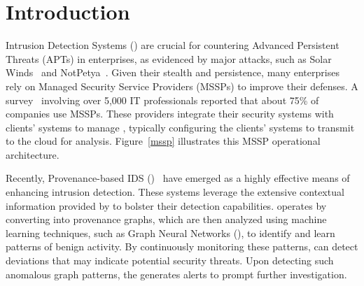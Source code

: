 \section{Introduction}
\label{s:intro}









Intrusion Detection Systems (\ids) are crucial for countering Advanced Persistent Threats (APTs) in enterprises, as evidenced by major attacks, such as Solar Winds~\cite{solarwinds} and NotPetya~\cite{notpetya}. Given their stealth and persistence, many enterprises rely on Managed Security Service Providers (MSSPs) to improve their defenses. A survey~\cite{msspsurvey} involving over 5,000 IT professionals reported that about 75\% of companies use MSSPs. These providers integrate their security systems with clients' systems to manage \logs, typically configuring the clients' systems to transmit \logs to the cloud for analysis. Figure~\ref{mssp} illustrates this MSSP operational architecture.



Recently, Provenance-based IDS (\pids)~\cite{streamspot,provdetector2020,wang2022threatrace,shadewatcher,yangprographer,han2020unicorn,jia2023magic,flash2024,cheng2023kairos,sigl} have emerged as a highly effective means of enhancing intrusion detection. These systems leverage the extensive contextual information provided by \logs to bolster their detection capabilities. \pids operates by converting \logs into provenance graphs, which are then analyzed using machine learning techniques, such as Graph Neural Networks (\gnnshort), to identify and learn patterns of benign activity. By continuously monitoring these patterns, \pids can detect deviations that may indicate potential security threats. Upon detecting such anomalous graph patterns, the \pids generates alerts to prompt further investigation.

